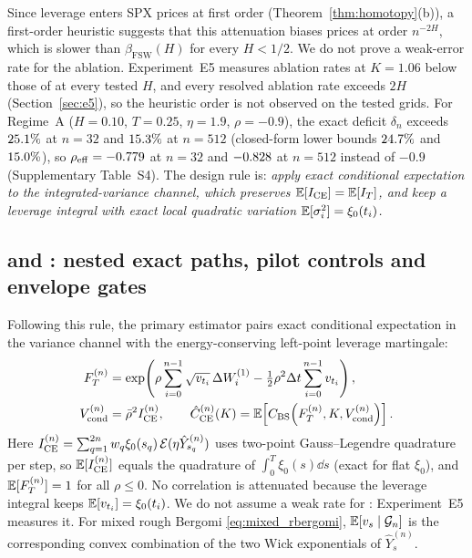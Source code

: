 Since leverage enters SPX prices at first order (Theorem~\ref{thm:homotopy}(b)), a first-order heuristic suggests that this attenuation biases prices at order $n^{-2H}$, which is slower than $\beta_{\mathrm{FSW}}(H)$ for every $H<1/2$. We do not prove a weak-error rate for the ablation. Experiment~E5 measures ablation rates at $K=1.06$ below those of \RCCE{} at every tested $H$, and every resolved ablation rate exceeds $2H$ (Section~\ref{sec:e5}), so the heuristic order is not observed on the tested grids. For Regime~A ($H=0.10$, $T=0.25$, $\eta=1.9$, $\rho=-0.9$), the exact deficit $\delta_n$ exceeds $25.1\%$ at $n=32$ and $15.3\%$ at $n=512$ (closed-form lower bounds $24.7\%$ and $15.0\%$), so $\rho_{\mathrm{eff}}=-0.779$ at $n=32$ and $-0.828$ at $n=512$ instead of $-0.9$ (Supplementary Table~S4). The design rule is: \emph{apply exact conditional expectation to the integrated-variance channel, which preserves $\mathbb{E}[I_{\mathrm{CE}}]=\mathbb{E}[I_T]$, and keep a leverage integral with exact local quadratic variation $\mathbb{E}[\sigma_i^2]=\xi_0(t_i)$.}

\subsection{\RCCE{} and \RCBridge{}: nested exact paths, pilot controls and envelope gates}
\label{sec:bridge}

Following this rule, the primary estimator \RCCE{} pairs exact conditional expectation in the variance channel with the energy-conserving left-point leverage martingale:
\begin{equation}
  \begin{aligned}
    F_T^{(n)} &= \exp\!\left(\rho\sum_{i=0}^{n-1}\sqrt{v_{t_i}}\,\Delta W_i^{(1)} - \tfrac12\rho^2\Delta t\sum_{i=0}^{n-1} v_{t_i}\right), \\
    V_{\mathrm{cond}}^{(n)} &= \bar{\rho}^2 I_{\mathrm{CE}}^{(n)},
    \qquad
    \hat{C}_{\mathrm{CE}}^{(n)}(K) = \mathbb{E}\!\left[C_{\mathrm{BS}}\!\left(F_T^{(n)},K,V_{\mathrm{cond}}^{(n)}\right)\right].
  \end{aligned}
  \label{eq:rc_ce}
\end{equation}
Here $I_{\mathrm{CE}}^{(n)}=\sum_{q=1}^{2n} w_q \xi_0(s_q)\,\mathcal{E}(\eta\hat{Y}_{s_q}^{(n)})$ uses two-point Gauss--Legendre quadrature per step, so $\mathbb{E}[I_{\mathrm{CE}}^{(n)}]$ equals the quadrature of $\int_0^T\xi_0(s)\dd s$ (exact for flat $\xi_0$), and $\mathbb{E}[F_T^{(n)}]=1$ for all $\rho\le0$. No correlation is attenuated because the leverage integral keeps $\mathbb{E}[v_{t_i}]=\xi_0(t_i)$. We do not assume a weak rate for \RCCE{}: Experiment~E5 measures it. For mixed rough Bergomi \eqref{eq:mixed_rbergomi}, $\mathbb{E}[v_s\mid\mathcal{G}_n]$ is the corresponding convex combination of the two Wick exponentials of $\hat{Y}_s^{(n)}$.

